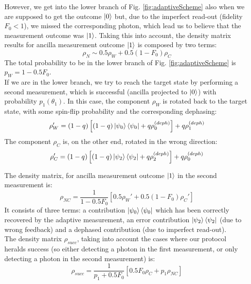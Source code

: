However, we get into the lower branch of Fig. \ref{fig:adaptiveScheme} also when we are supposed to get the outcome $\left|0\right>$ but, due to the imperfect read-out (fidelity $F_0<1$), we missed the corresponding photon, which lead us to believe that the measurement outcome was $\left|1\right>$. Taking this into account, the density matrix results for ancilla measurement outcome $\left|1\right>$ is composed by two terms:
\begin{equation}
 \rho_N \sim 0.5 \rho_W + 0.5 (1-F_0) \rho_C
 \label{eq:rhoN}
\end{equation}
The total probability to be in the lower branch of Fig. \ref{fig:adaptiveScheme} is $p_W = 1- 0.5 F_0$.\\
If we are in the lower branch, we try to reach the target state by performing a second measurement, which is successful (ancilla projected to $\left|0\right>$) with probability $p_1 (\theta_1)$. In this case, the component $\rho_W$ is rotated back to the target state, with some spin-flip probability and the corresponding dephasing:
\begin{equation}
 \rho_{W}' = (1-q) \left[ (1-q) \left|\psi_0\right>\left<\psi_0\right| + q \rho_0^{(deph)} \right] +q \rho_1^{(deph)}
\end{equation}
The component $\rho_C$ is, on the other end, rotated in the wrong direction:
\begin{equation}
  \rho_{C}' = (1-q) \left[ (1-q) \left|\psi_2\right>\left<\psi_2\right| + q \rho_2^{(deph)} \right] +q \rho_0^{(deph)}
 \label{eq:rho1c}
\end{equation}

The density matrix, for ancilla measurement outcome $\left|1\right>$ in the second measurement is:
\begin{equation}
 \rho_{NC} = \frac{1}{1-0.5F_0} \left[ 0.5 \rho_W' + 0.5 (1-F_0) \rho_C' \right]
\end{equation}
It consists of three terms: a contribution $\left|\psi_0\right>\left<\psi_0\right|$ which has been correctly recovered by the adaptive measurement, an error contribution $\left|\psi_2\right>\left<\psi_2\right|$ (due to wrong feedback) and a dephased contribution (due to imperfect read-out).\\
The density matrix $\rho_{succ}$, taking into account the cases where our protocol heralds success (so either detecting a photon in the first measurement, or only detecting a photon in the second measurement) is:
\begin{equation}
\rho_{succ} = \frac{1}{p_1 + 0.5 F_0} \left[  0.5 F_0  \rho_C + p_1 \rho_{NC} \right]
\end{equation}


